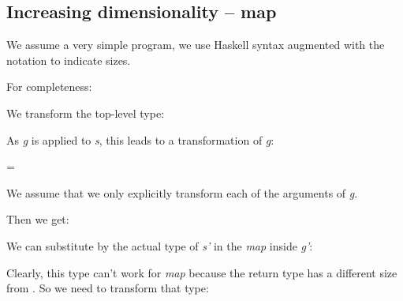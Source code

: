 \documentclass{article}
\newenvironment{lyxcode}
{\par\begin{list}{}{
\setlength{\rightmargin}{\leftmargin}
\setlength{\listparindent}{0pt}\raggedright
\setlength{\itemsep}{0pt}
\setlength{\parsep}{0pt}
\normalfont\ttfamily}\item[]}
{\end{list}}
\begin{document}
\subsection{Increasing dimensionality -- map}

We assume a very simple program, we use Haskell syntax \cite{hudak1992report} augmented with
the \texttt{} notation to indicate
sizes.
\begin{lyxcode}











\end{lyxcode}
For completeness:
\begin{lyxcode}



\end{lyxcode}
We transform the top-level type:

\emph{} \emph{}

As \emph{g} is applied to \emph{s}, this leads to a transformation
of \emph{g}:

= 

We assume that we only explicitly transform each of the arguments
of \emph{g}.

Then we get:
\begin{lyxcode}





\end{lyxcode}
We can substitute  by the actual type of \emph{s' }in the
\emph{map} inside \emph{g'}:
\begin{lyxcode}





\end{lyxcode}
Clearly, this type can't work for \emph{map} because the return type
\emph{} has a different size from
. So we need to transform that type:

 
\end{document}

